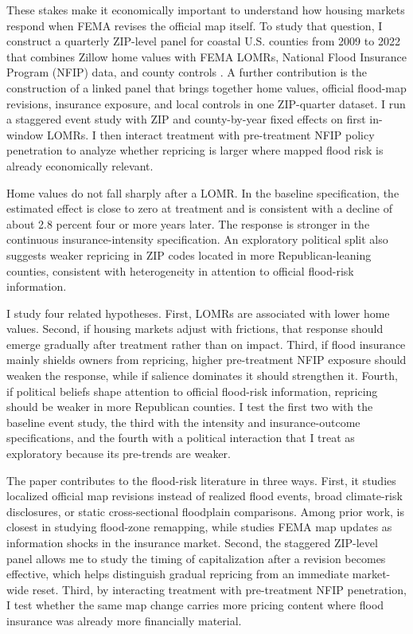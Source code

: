 \documentclass[12pt]{article}
\begin{document}
These stakes make it economically important to understand how housing markets respond when FEMA revises the official map itself. To study that question, I construct a quarterly ZIP-level panel for coastal U.S. counties from 2009 to 2022 that combines Zillow home values with FEMA LOMRs, National Flood Insurance Program (NFIP) data, and county controls \citep{Zillow_ZHVI,FEMA_LOMR,FEMA_NFIP}. A further contribution is the construction of a linked panel that brings together home values, official flood-map revisions, insurance exposure, and local controls in one ZIP-quarter dataset. I run a staggered event study with ZIP and county-by-year fixed effects on first in-window LOMRs. I then interact treatment with pre-treatment NFIP policy penetration to analyze whether repricing is larger where mapped flood risk is already economically relevant.

Home values do not fall sharply after a LOMR. In the baseline specification, the estimated effect is close to zero at treatment and is consistent with a decline of about 2.8 percent four or more years later. The response is stronger in the continuous insurance-intensity specification. An exploratory political split also suggests weaker repricing in ZIP codes located in more Republican-leaning counties, consistent with heterogeneity in attention to official flood-risk information.

I study four related hypotheses. First, LOMRs are associated with lower home values. Second, if housing markets adjust with frictions, that response should emerge gradually after treatment rather than on impact. Third, if flood insurance mainly shields owners from repricing, higher pre-treatment NFIP exposure should weaken the response, while if salience dominates it should strengthen it. Fourth, if political beliefs shape attention to official flood-risk information, repricing should be weaker in more Republican counties. I test the first two with the baseline event study, the third with the intensity and insurance-outcome specifications, and the fourth with a political interaction that I treat as exploratory because its pre-trends are weaker.

The paper contributes to the flood-risk literature in three ways. First, it studies localized official map revisions instead of realized flood events, broad climate-risk disclosures, or static cross-sectional floodplain comparisons. Among prior work, \citet{ShrZipp2019} is closest in studying flood-zone remapping, while \citet{Weill2023} studies FEMA map updates as information shocks in the insurance market. Second, the staggered ZIP-level panel allows me to study the timing of capitalization after a revision becomes effective, which helps distinguish gradual repricing from an immediate market-wide reset. Third, by interacting treatment with pre-treatment NFIP penetration, I test whether the same map change carries more pricing content where flood insurance was already more financially material.
\end{document}
